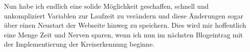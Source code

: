 Nun habe ich endlich eine solide Möglichkeit geschaffen, schnell und unkompliziert Variablen zur Laufzeit zu verändern und diese Änderungen sogar über einen Neustart der Webseite hinweg zu speichern. Dies wird mir hoffentlich eine Menge Zeit und Nerven sparen, wenn ich nun im nächsten Blogeintrag mit der Implementierung der Kreiserkennung beginne.